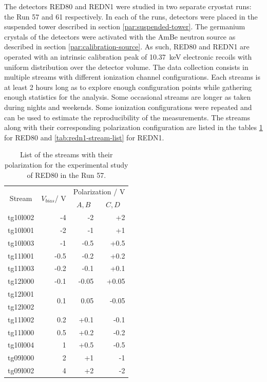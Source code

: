 The detectors RED80 and REDN1 were studied in two separate cryostat runs: the Run 57 and 61 respectively. In each of the runs, detectors were placed in the suspended tower described in section \ref{par:suspended-tower}. The germanium crystals of the detectors were activated with the AmBe neutron source as described in section \ref{par:calibration-source}. As such, RED80 and REDN1 are operated with an intrinsic calibration peak of \SI{10.37}{\kilo\eV} electronic recoils with uniform distribution over the detector volume. The data collection consists in multiple streams with different ionization channel configurations. Each streams is at least 2 hours long as to explore enough configuration points while gathering enough statistics for the analysis. Some occasional streams are longer as taken during nights and weekends. Some ionization configurations were repeated and can be used to estimate the reproducibility of the measurements. The streams along with their corresponding polarization configuration are listed in the tables \ref{tab:red80-stream-list} for RED80 and \ref{tab:redn1-stream-list} for REDN1.

\begin{table}[]
\centering
\begin{tabular}{c|rrr}
\multicolumn{1}{c|}{\multirow{2}{*}{Stream}} & \multicolumn{1}{c}{\multirow{2}{*}{$V_{bias}$/ V}} & \multicolumn{2}{|c}{Polarization / V}              \\ \cline{3-4} 
\multicolumn{1}{c|}{}                        & \multicolumn{1}{c|}{}                               & \multicolumn{1}{c|}{$A,B$} & \multicolumn{1}{c}{$C,D$} \\ \hline \hline
tg10l002 & -4   & -2    & +2    \\ \hline
tg10l001 & -2   & -1    & +1    \\ \hline
tg10l003 & -1   & -0.5  & +0.5  \\ \hline
tg11l001 & -0.5 & -0.2  & +0.2  \\ \hline
tg11l003 & -0.2 & -0.1  & +0.1  \\ \hline
tg12l000 & -0.1 & -0.05 & +0.05 \\ \hline
tg12l001                                     & \multirow{2}{*}{0.1}                                & \multirow{2}{*}{0.05}    & \multirow{2}{*}{-0.05}  \\
tg12l002 &      &       &       \\ \hline
tg11l002 & 0.2  & +0.1  & -0.1  \\ \hline
tg11l000 & 0.5  & +0.2  & -0.2  \\ \hline
tg10l004 & 1    & +0.5  & -0.5  \\ \hline
tg09l000 & 2    & +1    & -1    \\ \hline
tg09l002 & 4    & +2    & -2   
\end{tabular}%
\caption{List of the streams with their polarization for the experimental study of RED80 in the Run 57.}
\label{tab:red80-stream-list}
\end{table}


